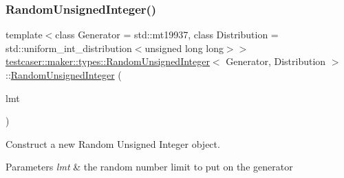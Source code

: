 \subsubsection{\texorpdfstring{RandomUnsignedInteger()}{RandomUnsignedInteger()}\hspace{0.1cm}{\footnotesize\ttfamily [2/3]}}
{\footnotesize\ttfamily template$<$class Generator = std\+::mt19937, class Distribution = std\+::uniform\+\_\+int\+\_\+distribution$<$unsigned long long$>$$>$ \\
\mbox{\hyperlink{classtestcaser_1_1maker_1_1types_1_1RandomUnsignedInteger}{testcaser\+::maker\+::types\+::\+Random\+Unsigned\+Integer}}$<$ Generator, Distribution $>$\+::\mbox{\hyperlink{classtestcaser_1_1maker_1_1types_1_1RandomUnsignedInteger}{Random\+Unsigned\+Integer}} (\begin{DoxyParamCaption}\item[{\mbox{\hyperlink{structtestcaser_1_1maker_1_1RandomUnsignedIntegerLimit}{testcaser\+::maker\+::\+Random\+Unsigned\+Integer\+Limit}}}]{lmt }\end{DoxyParamCaption})\hspace{0.3cm}{\ttfamily [inline]}}



Construct a new Random Unsigned Integer object. 


\begin{DoxyParams}{Parameters}
{\em lmt} & the random number limit to put on the generator \\
\hline
\end{DoxyParams}
\mbox{\label{classtestcaser_1_1maker_1_1types_1_1RandomUnsignedInteger_a485a3c55c963dbfd1fca8b62214f78ad}} 
